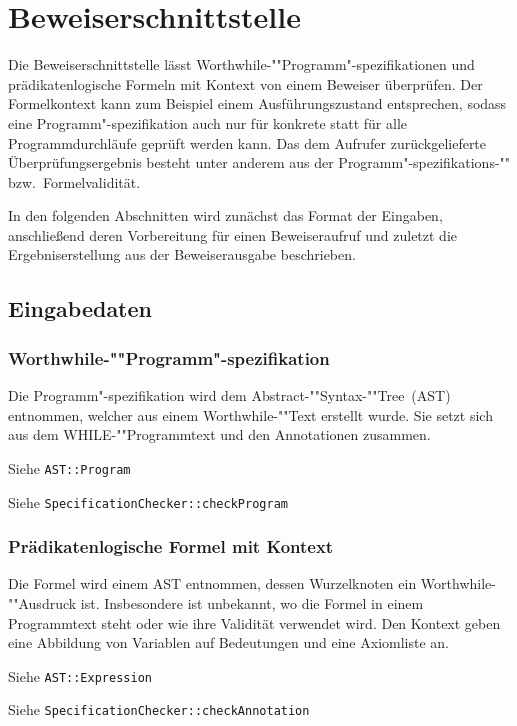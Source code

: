 \section{Beweiserschnittstelle}%

Die Beweiserschnittstelle lässt Worthwhile-""Programm"-spezifikationen
und prädikatenlogische Formeln mit Kontext von einem Beweiser
überprüfen. Der Formelkontext kann zum Beispiel einem
Ausführungszustand entsprechen, sodass eine Programm"-spezifikation
auch nur für konkrete statt für alle Programmdurchläufe geprüft werden
kann. Das dem Aufrufer zurückgelieferte Überprüfungsergebnis besteht
unter anderem aus der Programm"-spezifikations-"" bzw.\
Formelvalidität.

In den folgenden Abschnitten wird zunächst das Format der Eingaben,
anschließend deren Vorbereitung für einen Beweiseraufruf und zuletzt
die Ergebniserstellung aus der Beweiserausgabe beschrieben.%

\subsection{Eingabedaten}%

\subsubsection{Worthwhile-""Programm"-spezifikation}%

Die Programm"-spezifikation wird dem Abstract-""Syntax-""Tree~(AST)
entnommen, welcher aus einem Worthwhile-""Text erstellt wurde. Sie
setzt sich aus dem WHILE-""Programmtext und den Annotationen
zusammen.%

Siehe \texttt{AST::Program}%

Siehe \texttt{SpecificationChecker::checkProgram}%

\subsubsection{Prädikatenlogische Formel mit Kontext}%

Die Formel wird einem AST entnommen, dessen Wurzelknoten ein
Worthwhile-""Ausdruck ist. Insbesondere ist unbekannt, wo die Formel
in einem Programmtext steht oder wie ihre Validität verwendet wird.
Den Kontext geben eine Abbildung von Variablen auf Bedeutungen
und eine Axiomliste an.%

Siehe \texttt{AST::Expression}%

Siehe \texttt{SpecificationChecker::checkAnnotation}%

